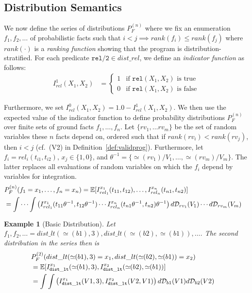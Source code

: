 \documentclass{tlp}
\newtheorem{example}{Example}
\newcommand{\val}{\simeq\!\!}
\begin{document}
\subsection{Distribution Semantics}
\label{sec:distributionsemantics}

We now define the series of distributions $P_F^{(n)}$ where we fix an
enumeration $f_1,f_2,\ldots$ of probabilistic facts such that $i < j
\implies rank(f_i) \leq rank(f_j)$ where $rank(\cdot)$ is a
\emph{ranking function} showing that the program is
distribution-stratified.  For each predicate $\mathtt{rel/2}\in
dist\_rel$, we define an \emph{indicator function} as follows:
\begin{align}
  I^1_{rel}(X_1,X_2) & =   
  \begin{cases}
    1  & \text{if } \mathtt{rel}(X_1,X_2) \text{ is true} \\
    0 & \text{if } \mathtt{rel}(X_1,X_2)  \text{ is false}
  \end{cases}
\end{align}

Furthermore, we set $I^0_{rel}(X_1,X_2) = 1.0 - I^1_{rel}(X_1,X_2)$.
We then use the expected value of the indicator function to define
probability distributions $P_F^{(n)}$ over finite sets of ground facts
$f_1,\ldots,f_n$. Let $\{rv_1,\ldots rv_m\}$ be the set of random
variables these $n$ facts depend on, ordered such that if
$rank(rv_i)<rank(rv_j)$, then $i<j$ (cf.~(V2) in
Definition~\ref{def:validprog}).  Furthermore, let $f_i =
rel_i(t_{i1},t_{i2})$, $x_j\in\{1,0\}$, and $\theta^{-1} =
\{\val(rv_1)/V_1,\ldots, \val(rv_m)/V_m\}$. The latter replaces all
evaluations of random variables on which the $f_i$ depend by variables
for integration.
\begin{align}
\lefteqn{P_F^{(n)}(f_1 = x_1, \ldots , f_n = x_n)
= \mathbb{E} [
I^{x_1}_{rel_1}(t_{11},t_{12}), \ldots ,
I^{x_n}_{rel_n}(t_{n1},t_{n2}) ]}\label{eq:series}\\
& = \idotsint \left( I^{x_1}_{rel_1}(t_{11}\theta^{-1}, t_{12}\theta^{-1})\cdots
I^{x_n}_{rel_n}(t_{n1}\theta^{-1}, t_{n2})\theta^{-1}\right) d\mathcal{D}_{rv_1}(V_1)\cdots d\mathcal{D}_{rv_m}(V_m)     \nonumber
\end{align}
\begin{example}[Basic Distribution]
Let $f_1,f_2,\ldots = dist\_lt(\val(b1), 3), dist\_lt(\val(b2), \val(b1)), \ldots$. The second distribution in the
series then is
\begin{align*}
\lefteqn{P_F^{(2)}(dist\_lt(\val(b1),  3)=x_1 ,dist\_lt(\val(b2), \val(b1))=x_2)}\\
  &= \mathbb{E} [ I_{\mathtt{dist\_lt}}^{x_1} (\val(b1),3),I_{\mathtt{dist\_lt}}^{x_2} (\val(b2),\val(b1))]\\
  &= \int\int \left(I_{\mathtt{dist\_lt} }^{x_1} (V1,3) ,I_{\mathtt{dist\_lt} }^{x_2} (V2,V1) \right)d\mathcal{D}_{b1}(V1)d\mathcal{D}_{b2}(V2)
\end{align*} 
\end{example}
\end{document}
